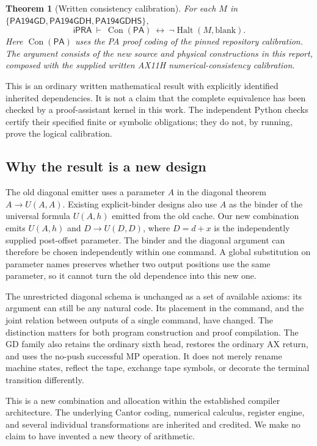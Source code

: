 \documentclass[11pt,letterpaper]{article}
\newtheorem{theorem}{Theorem}[section]
\theoremstyle{definition}
\newcommand{\ipra}{\mathsf{iPRA}}
\newcommand{\PA}{\mathsf{PA}}
\newcommand{\Con}{\operatorname{Con}}
\newcommand{\Halt}{\operatorname{Halt}}
\newcommand{\machine}[1]{\textsf{#1}}
\begin{document}
\begin{theorem}[Written consistency calibration]
For each $M$ in
$\{\machine{PA194GD},\machine{PA194GDH},\machine{PA194GDHS}\}$,
\[
  \ipra\ \vdash\ \Con(\PA)\ \longleftrightarrow\ \neg\Halt(M,\text{blank}).
\]
Here $\Con(\PA)$ uses the PA proof coding of the pinned repository
calibration. The argument consists of the new source and physical
constructions in this report, composed with the supplied written AX11H
numerical-consistency calibration.
\end{theorem}

This is an ordinary written mathematical result with explicitly identified
inherited dependencies. It is not a claim that the complete equivalence has
been checked by a proof-assistant kernel in this work. The independent
Python checks certify their specified finite or symbolic obligations;
they do not, by running, prove the logical calibration.



\subsection{Why the result is a new design}
The old diagonal emitter uses a parameter $A$ in the diagonal theorem
$A\to U(A,A)$. Existing explicit-binder designs also use $A$ as the binder
of the universal formula $U(A,h)$ emitted from the old cache. Our new
combination emits $U(A,h)$ and $D\to U(D,D)$, where $D=d+x$ is the
independently supplied post-offset parameter. The binder and the diagonal
argument can therefore be chosen independently within one command.
A global substitution on parameter names preserves whether two output
positions use the same parameter, so it cannot turn the old dependence into
this new one.

The unrestricted diagonal schema is unchanged as a set of available axioms:
its argument can still be any natural code. Its placement in the command,
and the joint relation between outputs of a single command, have changed.
The distinction matters for both program construction and proof compilation.
The GD family also retains the ordinary sixth head, restores the ordinary
AX return, and uses the no-push successful MP operation. It does not merely
rename machine states, reflect the tape, exchange tape symbols, or decorate
the terminal transition differently.

This is a new combination and allocation within the established compiler
architecture. The underlying Cantor coding, numerical calculus,
register engine, and several individual transformations are inherited and
credited. We make no claim to have invented a new theory of arithmetic.
\end{document}
